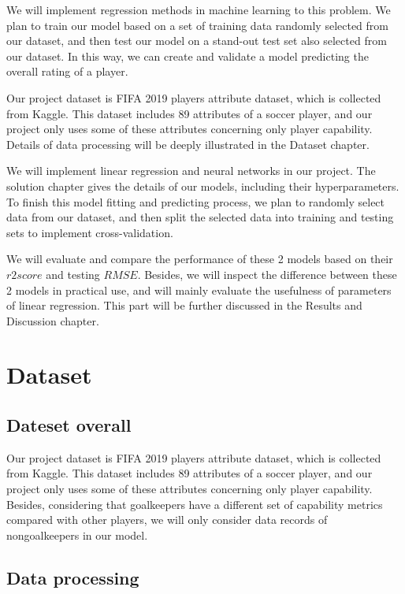 \documentclass{article}
\begin{document}
We will implement regression methods in machine learning to this problem. We plan to train our model based on a set of training data randomly selected from our dataset, and then test our model on a stand-out test set also selected from our dataset. In this way, we can create and validate a model predicting the overall rating of a player.


Our project dataset is FIFA 2019 players attribute dataset, which is collected from Kaggle. This dataset includes 89 attributes of a soccer player, and our project only uses some of these attributes concerning only player capability. Details of data processing will be deeply illustrated in the Dataset chapter.

We will implement linear regression and neural networks in our project. The solution chapter gives the details of our models, including their hyperparameters. To finish this model fitting and predicting process, we plan to randomly select data from our dataset, and then split the selected data into training and testing sets to implement cross-validation.

We will evaluate and compare the performance of these 2 models based on their $r2 score$ and testing $RMSE$. Besides, we will inspect the difference between these 2 models in practical use, and will mainly evaluate the usefulness of parameters of linear regression. This part will be further discussed in the Results and Discussion chapter.


\section*{Dataset}

\subsection*{Dateset overall}

Our project dataset is FIFA 2019 players attribute dataset, which is collected
from Kaggle. This dataset includes 89 attributes of a soccer player, and our
project only uses some of these attributes concerning only player capability.
Besides, considering that goalkeepers have a different set of capability
metrics compared with other players, we will only consider data records of nongoalkeepers in our model.



\subsection*{Data processing}
\end{document}
